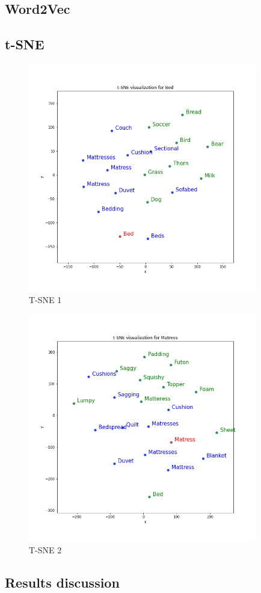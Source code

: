 \documentclass[a4paper]{article}    %
\begin{document}
\subsection{Word2Vec}



\subsection{t-SNE}

\graphicspath{{../figures/Q10/}}

\begin{figure}[H]
    \centering
    \includegraphics[width=10cm]{tsne1}
    \caption{T-SNE 1}
    \label{fig:tsne1}
\end{figure}

\begin{figure}[H]
    \centering
    \includegraphics[width=10cm]{tsne2}
    \caption{T-SNE 2}
    \label{fig:tsne2}
\end{figure}

\subsection{Results discussion}

\end{document}
